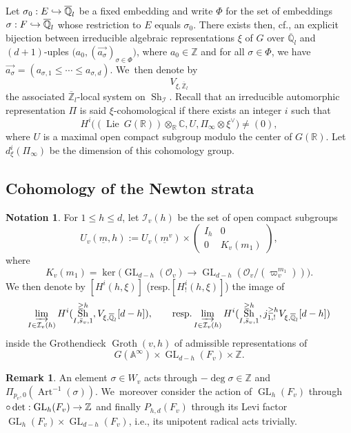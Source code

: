 \documentclass[11pt]{article}
\newcommand{\ie}{i.e.,\xspace}
\newcommand{\cf}{cf.\xspace}
\newcommand{\resp}{resp.\xspace}
\newcommand{\Subsection}{\subsection}
\newcommand{\NoChangel}[1]{%
\expandafter\let\csname old\string#1\endcsname=#1
\let#1=\relax
\newcommand{#1}{\mathcode`l="716C\csname old\string#1\endcsname\mathcode`l="7160 }%
}
\def\hto{\mathrel{\lhook\joinrel\to}}
\DeclareMathOperator{\GL}{GL}
\theoremstyle{plain}
\theoremstyle{definition}
\newtheorem*{remark}{Remark}
\newtheorem{nota}[equation]{Notation}
\numberwithin{equation}{subsection}
\newcommand\Am{{\mathbb A}}
\newcommand\Qm{{\mathbb Q}}
\newcommand\Zm{{\mathbb Z}}
\newcommand\Cm{{\mathbb C}}
\newcommand\Rm{{\mathbb R}}
\newcommand\IC{{\mathcal I}}
\newcommand\OC{{\mathcal O}}
\DeclareMathOperator{\lie}{Lie}
\DeclareMathOperator{\sh}{Sh}
\DeclareMathOperator{\art}{Art}
\DeclareMathOperator{\groth}{Groth}
\DeclareMathOperator{\val}{val}\NoChangel{\val}
\let \oo=\infty
\begin{document}
Let $\sigma_0:E \hto
\overline{\Qm}_l$ be a fixed embedding and write $\Phi$ for the set of embeddings
$\sigma:F \hto \overline \Qm_l$ whose restriction to $E$ equals $\sigma_0$.
There exists then, \cf \cite[p.\,97]{h-t}, an explicit bijection between irreducible algebraic representations
$\xi$ of $G$ over $\overline \Qm_l$ and $(d+1)$-uples
$\bigl (a_0, (\overrightarrow{a_\sigma})_{\sigma \in \Phi} \bigr)$,
where $a_0 \in \Zm$ and for all $\sigma \in \Phi$, we have \hbox{$\overrightarrow{a_\sigma}=
(a_{\sigma,1} \leq \cdots \leq a_{\sigma,d})$}.
We~then denote by
\[
V_{\xi,\overline \Zm_l}
\]
the associated $\overline \Zm_l$-local system on $\sh_\IC$.
Recall that an irreducible automorphic representation $\Pi$ is said $\xi$-cohomological if there exists
an integer $i$ such that
\[
H^i \bigl ((\lie ~G(\Rm)) \otimes_\Rm \Cm,U,\Pi_\oo \otimes \xi^\vee \bigr) \neq (0),
\]
where $U$ is a maximal open compact subgroup modulo the center of $G(\Rm)$.
Let $d_\xi^i(\Pi_\oo)$ be the dimension of this cohomology group.

\Subsection{Cohomology of the Newton strata}
\label{para-hecke}

\begin{nota} \label{nota-hixi}
For $1 \leq h \leq d$, let $\IC_v(h)$ be the set of open compact subgroups
\[
U_v(\underline m,h):=
U_v(\underline m^v) \times \left (\begin{array}{cc} I_h & 0 \\ 0 & K_v(m_1) \end{array} \right),
\]
where
\[
K_v(m_1)=\ker \bigl (\GL_{d-h}(\OC_v) \to \GL_{d-h}(\OC_v/ (\varpi_v^{m_1})) \bigr).
\]
We then denote by $[H^i(h,\xi)]$ (\resp $[H^i_!(h,\xi)]$) the image of
\[
\varinjlim_{{I \in \IC_v(h)}} H^i(\sh_{I,\bar s_v,1}^{\geq h}, V_{\xi,\overline \Qm_l}[d-h]),
\qquad \hbox{\resp }
\varinjlim_{{I \in \IC_v(h)}} H^i(\sh_{I,\bar s_v,1}^{\geq h}, j^{\geq h}_{1,!} V_{\xi,\overline \Qm_l}[d-h])
\]
inside the Grothendieck $\groth(v,h)$ of admissible representations of
\[
G(\Am^{\oo}) \times \GL_{d-h}(F_v) \times \Zm.
\]
\end{nota}

\begin{remark}
An element $\sigma \in W_v$ acts through $-\deg \sigma \in \Zm$ and $\Pi_{p_v,0}(\art^{-1} (\sigma))$.
We~moreover consider the action of $\GL_{h}(F_v)$ through
$\val \circ \det: \GL_{h}(F_v) \to \Zm$ and finally
$P_{h,d}(F_v)$ through its Levi factor $\GL_{h}(F_v) \times \GL_{d-h}(F_v)$, \ie its unipotent radical acts trivially.
\end{remark}
\end{document}
